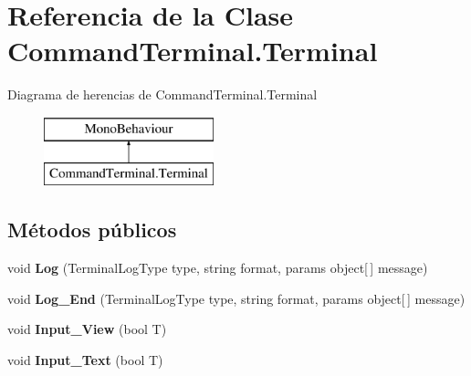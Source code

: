 \hypertarget{class_command_terminal_1_1_terminal}{}\section{Referencia de la Clase Command\+Terminal.\+Terminal}
\label{class_command_terminal_1_1_terminal}
Diagrama de herencias de Command\+Terminal.\+Terminal\begin{figure}[H]
\begin{center}
\leavevmode
\includegraphics[height=2.000000cm]{class_command_terminal_1_1_terminal}
\end{center}
\end{figure}
\subsection*{Métodos públicos}
\begin{DoxyCompactItemize}
\item 
\mbox{\label{class_command_terminal_1_1_terminal_aed10e8ce3d7b7c8f5844de0246b59fbc}} 
void {\bfseries Log} (Terminal\+Log\+Type type, string format, params object\mbox{[}$\,$\mbox{]} message)
\item 
\mbox{\label{class_command_terminal_1_1_terminal_a21b01ad621533deee8511f63cf5acb9c}} 
void {\bfseries Log\+\_\+\+End} (Terminal\+Log\+Type type, string format, params object\mbox{[}$\,$\mbox{]} message)
\item 
\mbox{\label{class_command_terminal_1_1_terminal_a58340ff13a5e389f9967cde9e42b7344}} 
void {\bfseries Input\+\_\+\+View} (bool T)
\item 
\mbox{\label{class_command_terminal_1_1_terminal_aea8cb3ff71030a8b7ca4d2fbb4131a7f}} 
void {\bfseries Input\+\_\+\+Text} (bool T)
\end{DoxyCompactItemize}
